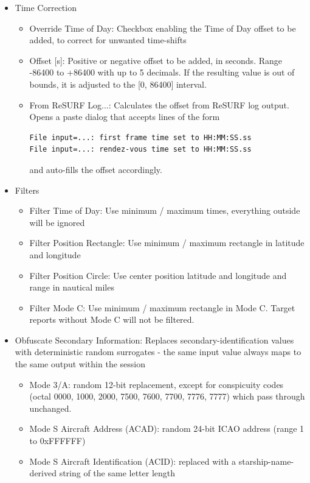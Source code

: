 \begin{itemize}
\item Time Correction
\begin{itemize}
\item Override Time of Day: Checkbox enabling the Time of Day offset to be added, to correct for unwanted time-shifts
\item Offset [s]: Positive or negative offset to be added, in seconds. Range -86400 to +86400 with up to 5 decimals. If the resulting value is out of bounds, it is adjusted to the [0, 86400] interval.
\item From ReSURF Log...: Calculates the offset from ReSURF log output. Opens a paste dialog that accepts lines of the form

\begin{lstlisting}
File input=...: first frame time set to HH:MM:SS.ss
File input=...: rendez-vous time set to HH:MM:SS.ss
\end{lstlisting}

and auto-fills the offset accordingly.
\end{itemize}
\item Filters
\begin{itemize}
\item Filter Time of Day: Use minimum / maximum times, everything outside will be ignored
\item Filter Position Rectangle: Use minimum / maximum rectangle in latitude and longitude
\item Filter Position Circle: Use center position latitude and longitude and range in nautical miles
\item Filter Mode C: Use minimum / maximum rectangle in Mode C. Target reports without Mode C will not be filtered.
\end{itemize}
\item Obfuscate Secondary Information: Replaces secondary-identification values with deterministic random surrogates - the same input value always maps to the same output within the session
\begin{itemize}
\item Mode 3/A: random 12-bit replacement, except for conspicuity codes (octal 0000, 1000, 2000, 7500, 7600, 7700, 7776, 7777) which pass through unchanged.
\item Mode S Aircraft Address (ACAD): random 24-bit ICAO address (range 1 to 0xFFFFFF)
\item Mode S Aircraft Identification (ACID): replaced with a starship-name-derived string of the same letter length
\end{itemize}
\end{itemize}
\ \\

